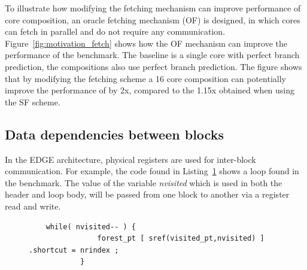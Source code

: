 To illustrate how modifying the fetching mechanism can improve performance of core composition, an oracle fetching mechanism (OF) is designed, in which cores can fetch in parallel and do not require any communication.
Figure~\ref{fig:motivation_fetch} shows how the OF mechanism can improve the performance of the  benchmark.
The baseline is a single core with perfect branch prediction, the compositions also use perfect branch prediction.
The figure shows that by modifying the fetching scheme a 16 core composition can potentially improve the performance of  by 2x, compared to the 1.15x obtained when using the SF scheme.

\subsection{Data dependencies between blocks}

In the EDGE architecture, physical registers are used for inter-block communication.
For example, the code found in Listing~\ref{lst:mser_snipet} shows a loop found in the  benchmark.
The value of the variable \textit{nvisited} which is used in both the header and loop body, will be passed from one block to another via a register read and write.


\begin{figure}[t]
\lstset{language=C,numbersep=4pt}
\begin{center}
\begin{lstlisting}
	while( nvisited-- ) {
				forest_pt [ sref(visited_pt,nvisited) ] .shortcut = nrindex ;
			}
\end{lstlisting}
\end{center}
\vspace{-1em}
\label{lst:mser_snipet}
\vspace{1em}
\end{figure}

